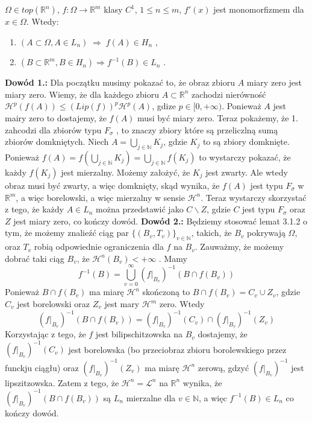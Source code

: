 \begin{tw}
	$\Omega \in top(\mathbb{R}^n)$, $f: \Omega \rightarrow \mathbb{R}^m$ klasy $C^1$, $1 \leq n \leq m$, $f'(x)$ jest monomorfizmem dla $x \in \Omega$. Wtedy:
	\begin{enumerate}	
		\item $(A \subset \Omega, A \in L_n) \; \Longrightarrow \; f(A) \in H_n$ ,
		\item $(B \subset \mathbb{R}^m, B \in H_n) \Longrightarrow f^{-1}(B) \in L_n$ .
	\end{enumerate}

	\textbf{Dowód 1.:}\newline
		Dla początku musimy pokazać to, że obraz zbioru $A$ miary zero jest miary zero. Wiemy, że dla każdego zbioru $A \subset \mathbb{R}^n$ zachodzi nierówność $\mathcal{H}^p(f(A)) \leq (Lip(f))^p \mathcal{H}^p(A)$, gdize $p \in [0, +\infty)$. Ponieważ $A$ jest mairy zero to dostajemy, że $f(A)$ musi być miary zero. 
		Teraz pokażemy, że 1. zahcodzi dla zbiorów typu $F_{\sigma}$ , to znaczy zbiory które są przeliczlną sumą zbiorów domkniętych. Niech $A = \bigcup_{j \in \mathbb{N}} K_j$, gdzie $K_j$ to są zbiory domknięte. Ponieważ $f(A) = f(\bigcup_{j \in \mathbb{N}} K_j) = \bigcup_{j \in \mathbb{N}} f(K_j)$ to wystarczy pokazać, że każdy $f(K_j)$ jest mierzalny. Możemy założyć, że $K_j$ jest zwarty. Ale wtedy obraz musi być zwarty, a więc domknięty, skąd wynika, że $f(A)$ jest typu $F_{\sigma}$ w $\mathbb{R}^m$, a więc borelowski, a więc mierzalny w sensie $\mathcal{H}^n$. 
		Teraz wystarczy skorzystać z tego, że każdy $A \in L_n$ można przedstawić jako $C \backslash Z$, gdzie $C$ jest typu $F_{\sigma}$ oraz $Z$ jest miary zero, co kończy dowód.
	\newline
	\textbf{Dowód 2.:}\newline
		Będziemy stosować lemat 3.1.2 o tym, że możemy znalieźć ciąg par $\{(B_v, T_v)\}_{v \in \mathbb{N}}$, takich, że $B_v$ pokrywają $\Omega$, oraz $T_v$ robią odpowiednie ograniczenia dla $f$ na $B_v$. Zauważmy, że możemy dobrać taki ciąg $B_v$, że $\mathcal{H}^n(B_v) < + \infty$ . Mamy $$ 
			f^{-1}(B) = \bigcup_{v=0}^{\infty} (f|_{B_v})^{-1} (B \cap f(B_v))
		$$
		Ponieważ $B \cap f(B_v)$ ma miarę $\mathcal{H}^n$ skończoną to $B \cap f(B_v) = C_v \cup Z_v$, gdzie $C_v$ jest borelowski oraz $Z_v$ jest mary $\mathcal{H}^m$ zero. Wtedy $$ 
			(f|_{B_v})^{-1}(B \cap f(B_v)) = (f|_{B_v})^{-1}(C_v) \cap (f|_{B_v})^{-1}(Z_v)
		$$
		Korzystając z tego, że $f$ jest bilipschitzowska na $B_v$ dostajemy, że $(f|_{B_v})^{-1}(C_v)$ jest borelowska (bo przeciobraz zbioru borolewskiego przez funckju ciągłu) oraz $(f|_{B_v})^{-1}(Z_v)$ ma miarę $\mathcal{H}^n$ zerową, gdzyć $(f|_{B_v})^{-1}$ jest lipszitzowska. Zatem z tego, że $\mathcal{H}^n = \mathcal{L}^n$ na $\mathbb{R}^n$ wynika, że $(f|_{B_v})^{-1}(B \cap f(B_v))$ są $L_n$ mierzalne dla $v \in \mathbb{N}$, a więc $f^{-1}(B) \in L_n$ co kończy dowód. 
\end{tw}